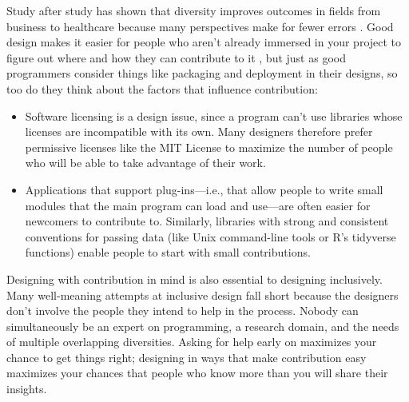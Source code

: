 \documentclass[10pt,letterpaper]{article}
\begin{document}
Study after study has shown that diversity improves outcomes in fields from business to healthcare
because many perspectives make for fewer errors \cite{Gompers2018,Gomez2019}.
Good design makes it easier for people who aren't already immersed in your project
to figure out where and how they can contribute to it \cite{Sholler2019},
but just as good programmers consider things like packaging and deployment in their designs,
so too do they think about the factors that influence contribution:

\begin{itemize}

\item
  Software licensing is a design issue,
  since a program can't use libraries whose licenses are incompatible with its own.
  Many designers therefore prefer permissive licenses like the MIT License
  to maximize the number of people who will be able to take advantage of their work.

\item
  Applications that support plug-ins---i.e.,
  that allow people to write small modules that the main program can load and use---are
  often easier for newcomers to contribute to.
  Similarly,
  libraries with strong and consistent conventions for passing data
  (like Unix command-line tools or R's tidyverse functions)
  enable people to start with small contributions.

\end{itemize}

Designing with contribution in mind is also essential to designing inclusively.
Many well-meaning attempts at inclusive design fall short
because the designers don't involve the people they intend to help in the process.
Nobody can simultaneously be an expert on programming,
a research domain,
and the needs of multiple overlapping diversities.
Asking for help early on maximizes your chance to get things right;
designing in ways that make contribution easy maximizes your chances
that people who know more than you will share their insights.
\end{document}

